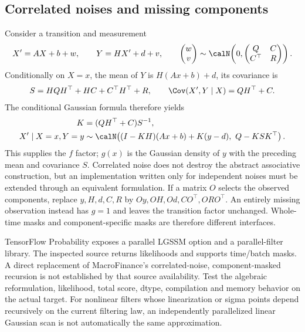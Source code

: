 \subsection{Correlated noises and missing components}

Consider a transition and measurement
\begin{equation}
 X'=AX+b+w,\qquad Y=HX'+d+v,\qquad
 \begin{pmatrix}w\\v\end{pmatrix}
 \sim\calN\!\left(0,
 \begin{pmatrix}Q&C\\C^\top&R\end{pmatrix}\right).
 \label{eq:bf-modern-correlated-ssm}
\end{equation}
Conditionally on $X=x$, the mean of $Y$ is $H(Ax+b)+d$, its covariance
is
\begin{equation}
 S=HQH^\top+HC+C^\top H^\top+R,\qquad
 \Cov(X',Y\mid X)=QH^\top+C.
 \label{eq:bf-modern-correlated-innovation}
\end{equation}
The conditional Gaussian formula therefore yields
\begin{align}
 K&=(QH^\top+C)S^{-1},\\
 X'\mid X=x,Y=y
 &\sim\calN\!\left((I-KH)(Ax+b)+K(y-d),\ Q-KSK^\top\right).
 \label{eq:bf-modern-correlated-conditional}
\end{align}
This supplies the $f$ factor; $g(x)$ is the Gaussian density of $y$ with
the preceding mean and covariance $S$. Correlated noise does not destroy
the abstract associative construction, but an implementation written only
for independent noises must be extended through an equivalent formulation.
If a matrix $O$ selects the observed components, replace $y,H,d,C,R$ by
$Oy,OH,Od,CO^\top,ORO^\top$. An entirely missing observation instead has
$g=1$ and leaves the transition factor unchanged. Whole-time masks and
component-specific masks are therefore different interfaces.

TensorFlow Probability exposes a parallel LGSSM option and a parallel-filter
library. The inspected source returns likelihoods and supports time/batch
masks. A direct replacement of MacroFinance's correlated-noise,
component-masked recursion is not established by that source availability.
Test the algebraic reformulation, likelihood, total score, dtype, compilation
and memory behavior on the actual target. For nonlinear filters whose
linearization or sigma points depend recursively on the current filtering
law, an independently parallelized linear Gaussian scan is not automatically
the same approximation.

